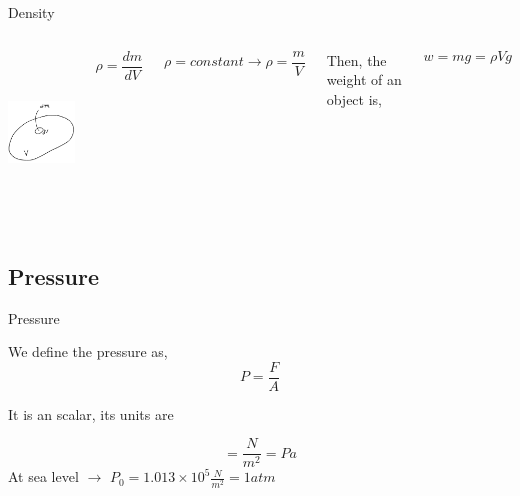 \documentclass[]{beamer}
\begin{document}
\begin{frame}

  \textcolor{mypink1}{Density}

 \vspace{5mm}


   \begin{columns}[c]
   \column{2in}  %
  \includegraphics[height=1.7in]{images2/1.jpg}
  
   \column{2in}
    
   \pause
\begin{equation}
\rho=\frac{dm}{dV}
\end{equation}

\pause

\begin{equation*}
\rho=constant \rightarrow \rho =\frac{m}{V}
\end{equation*}

\pause
Then, the weight of an object is,

\pause
\begin{equation*}
w=mg=\rho V g
\end{equation*}


   \end{columns}




  \end{frame}


\subsection{Pressure}


\begin{frame}

  \textcolor{mypink1}{Pressure}

  \vspace{5mm}
  \pause
  We define the pressure as,
  \pause
  \begin{equation}
  P=\frac{F}{A}
  \end{equation}

  It is an scalar, its units are
  \pause

  \begin{equation}
  [P]=\frac{N}{m^2}=Pa
  \end{equation}
  \vspace{3mm}
  \pause
   At sea level $\rightarrow$ $\boxed{P_0=1.013\times10^5\frac{N}{m^2}=1atm}$

  \vspace{3mm}



  \end{frame}
\end{document}
